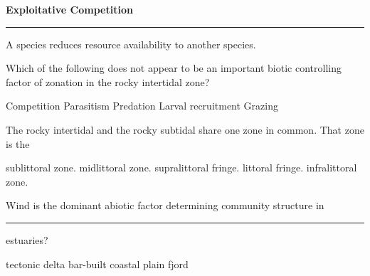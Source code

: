 \documentclass[11pt, addpoints]{exam}
\newcommand*\Matching[1]{
\ifprintanswers
	\textbf{#1}
\else
	\rule{2.1in}{0.5pt}
\fi
}
\newlength\matchlena
\newlength\matchlenb
\newcommand\MatchQuestion[2]{%
	\setlength\matchlenb{\linewidth}
	\addtolength\matchlenb{-\matchlena}
	\parbox[t]{\matchlena}{\Matching{#1}}\enspace\parbox[t]{\matchlenb}{#2}}
\newcommand{\bumppoints}[1]{%
	\addtocounter{numpoints}{#1}
}
\begin{document}
\begin{questions}

\question\MatchQuestion{Exploitative Competition}{A species reduces resource availability to another species.}

\vspace{1\baselineskip}


\bumppoints{10}



\question
Which of the following does not appear to be an important biotic controlling factor of zonation in the rocky intertidal zone?

\begin{choices}
\choice  Competition  
\correctchoice Parasitism 
\choice Predation 
\choice Larval recruitment 
\choice Grazing 
\end{choices}

%
%
%
%
%
%

\question
The rocky intertidal and the rocky subtidal share one zone in common. That zone is the

\begin{choices}
\choice sublittoral zone.
\choice midlittoral zone.
\choice supralittoral fringe.
\choice littoral fringe.
\correctchoice infralittoral zone.
\end{choices}

\question
Wind is the dominant abiotic factor determining community structure in \rule{1.25in}{0.4pt} estuaries?

\begin{choices}
\choice tectonic
\choice delta
\correctchoice bar-built
\choice coastal plain
\choice fjord
\end{choices}


\end{questions}
\end{document}
